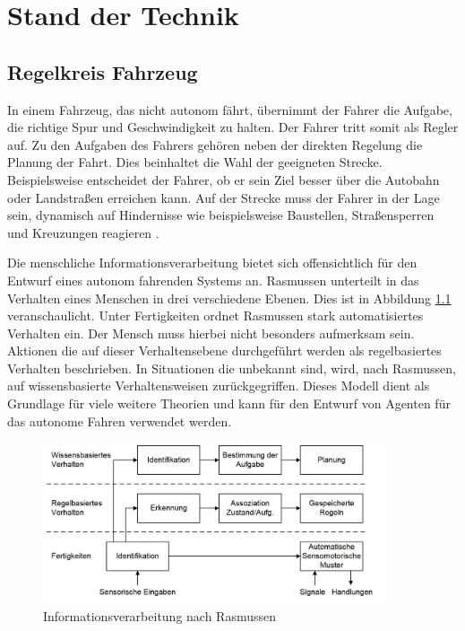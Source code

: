 
\chapter{Stand der Technik}
\section{Regelkreis Fahrzeug}
In einem Fahrzeug, das nicht autonom fährt, übernimmt der Fahrer die Aufgabe, die richtige Spur und Geschwindigkeit zu halten. Der Fahrer tritt somit als Regler auf. Zu den Aufgaben des Fahrers gehören neben der direkten Regelung die Planung der Fahrt. Dies beinhaltet die Wahl der geeigneten Strecke. Beispielsweise entscheidet der Fahrer, ob er sein Ziel besser über die Autobahn oder Landstraßen erreichen kann. Auf der Strecke muss der Fahrer in der Lage sein, dynamisch auf Hindernisse wie beispielsweise Baustellen, Straßensperren und Kreuzungen reagieren \cite{MIT15}.

Die menschliche Informationsverarbeitung bietet sich offensichtlich für den Entwurf eines autonom fahrenden Systems an. Rasmussen unterteilt in \cite{RAS83} das Verhalten eines Menschen in drei verschiedene Ebenen. Dies ist in Abbildung \ref{RAS:INF} veranschaulicht. Unter Fertigkeiten ordnet Rasmussen stark automatisiertes Verhalten ein. Der Mensch muss hierbei nicht besonders aufmerksam sein. Aktionen die auf dieser Verhaltensebene durchgeführt werden als regelbasiertes Verhalten beschrieben. In Situationen die unbekannt sind, wird, nach Rasmussen, auf wissensbasierte Verhaltensweisen zurückgegriffen. Dieses Modell dient als Grundlage für viele weitere Theorien und kann für den Entwurf von Agenten für das autonome Fahren verwendet werden.
\FloatBarrier
\begin{figure}[h]
  \centering
  \includegraphics[width=0.9\textwidth]{images/stand_der_technik/Rasmussen.JPG}
  \caption[Informationsverarbeitung nach Rasmussen]{Informationsverarbeitung nach Rasmussen \cite{RAS83}}
  \label{RAS:INF}
\end{figure}
\FloatBarrier

